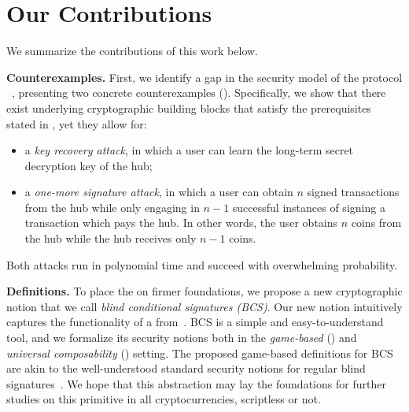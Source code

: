 \section{Our Contributions}
We summarize the contributions of this work below.

\smallskip\noindent\textbf{Counterexamples.}
First, we identify a gap in the security model of the \syncpuzzle protocol \aal~\cite{SP:TaiMorMaf21},  presenting two concrete counterexamples (). Specifically, we show that there exist underlying cryptographic building blocks that satisfy the prerequisites stated in \aal, yet they allow for:
\begin{itemize}
    \item a \emph{key recovery attack}, in which a user can learn the long-term secret decryption key of the hub;
    \item a \emph{one-more signature attack}, in which a user can obtain $n$ signed transactions from the hub while only engaging in $n-1$ successful instances of signing a transaction which pays the hub. In other words, the user obtains $n$ coins from the hub while the hub receives only $n-1$ coins. 
\end{itemize}
Both attacks run in polynomial time and succeed with overwhelming probability.

\smallskip\noindent\textbf{Definitions.} To place the \syncpuzzle on firmer foundations, we propose a new cryptographic notion that we call \emph{blind conditional signatures (BCS)}. Our new notion intuitively captures the functionality of a \emph{\syncpuzzle} from~\cite{NDSS:HABSG17,SP:TaiMorMaf21}. BCS is a simple and easy-to-understand tool, and we formalize its security notions both in the \emph{game-based} () and \emph{universal composability} () setting. The proposed game-based definitions for BCS are akin to the well-understood standard security notions for regular blind signatures~\cite{C:Chaum82,JC:SchUnr17}. We hope that this abstraction may lay the foundations for further studies on this primitive in all cryptocurrencies, scriptless or not.


